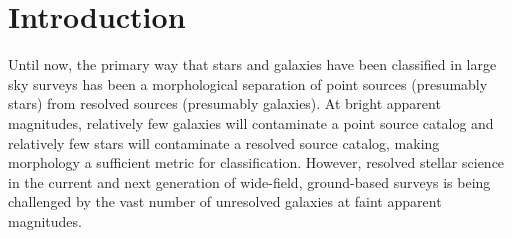 \documentclass[12pt,preprint]{aastex}
\begin{document}
%
%
\section{Introduction}

Until now, the primary way that stars and galaxies have been
classified in large sky surveys has been a morphological separation
\citep[e.g.,][]{kron80,yee91,vasconcellos11a,henrion11a} of point
sources (presumably stars) from resolved sources (presumably
galaxies).  At bright apparent magnitudes, relatively few galaxies
will contaminate a point source catalog and relatively few stars will
contaminate a resolved source catalog, making morphology a sufficient
metric for classification.  However, resolved stellar science in the
current and next generation of wide-field, ground-based surveys is
being challenged by the vast number of unresolved galaxies at faint
apparent magnitudes.  
\end{document}
